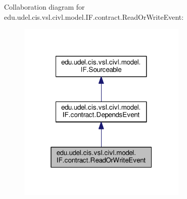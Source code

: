 Collaboration diagram for edu.\+udel.\+cis.\+vsl.\+civl.\+model.\+I\+F.\+contract.\+Read\+Or\+Write\+Event\+:
\nopagebreak
\begin{figure}[H]
\begin{center}
\leavevmode
\includegraphics[width=229pt]{interfaceedu_1_1udel_1_1cis_1_1vsl_1_1civl_1_1model_1_1IF_1_1contract_1_1ReadOrWriteEvent__coll__graph}
\end{center}
\end{figure}
